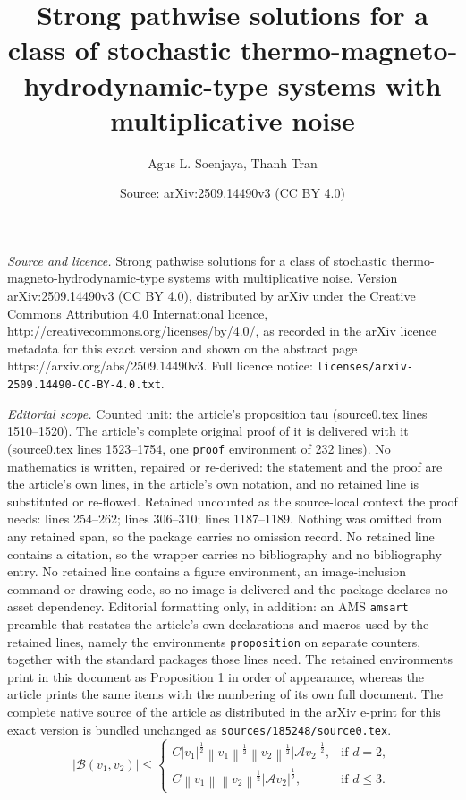 \documentclass[10pt,a4paper]{amsart}
\title{Strong pathwise solutions for a class of stochastic thermo-magneto-hydrodynamic-type systems with multiplicative noise}
\author{Agus L. Soenjaya, Thanh Tran}
\date{Source: arXiv:2509.14490v3 (CC BY 4.0)}
\newcommand{\abs}[1]{\left|{#1}\right|}
\newcommand{\norm}[1]{\left\|{#1}\right\|}
\begin{document}
\maketitle

\noindent\emph{Source and licence.} Strong pathwise solutions for a class of stochastic thermo-magneto-hydrodynamic-type systems with multiplicative noise. Version arXiv:2509.14490v3 (CC BY 4.0), distributed by arXiv under the Creative Commons Attribution 4.0 International licence, http://creativecommons.org/licenses/by/4.0/, as recorded in the arXiv licence metadata for this exact version and shown on the abstract page https://arxiv.org/abs/2509.14490v3. Full licence notice: \texttt{licenses/arxiv-2509.14490-CC-BY-4.0.txt}.\par\smallskip

\noindent\textit{Editorial scope.} Counted unit: the article's proposition tau (source0.tex lines 1510--1520). The article's complete original proof of it is delivered with it (source0.tex lines 1523--1754, one \texttt{proof} environment of 232 lines). No mathematics is written, repaired or re-derived: the statement and the proof are the article's own lines, in the article's own notation, and no retained line is substituted or re-flowed.  Retained uncounted as the source-local context the proof needs: lines 254--262; lines 306--310; lines 1187--1189.  Nothing was omitted from any retained span, so the package carries no omission record.  No retained line contains a citation, so the wrapper carries no bibliography and no bibliography entry.  No retained line contains a figure environment, an image-inclusion command or drawing code, so no image is delivered and the package declares no asset dependency.  Editorial formatting only, in addition: an AMS \texttt{amsart} preamble that restates the article's own declarations and macros used by the retained lines, namely the environments \texttt{proposition} on separate counters, together with the standard packages those lines need.  The retained environments print in this document as Proposition 1 in order of appearance, whereas the article prints the same items with the numbering of its own full document.  The complete native source of the article as distributed in the arXiv e-print for this exact version is bundled unchanged as \texttt{sources/185248/source0.tex}.
	\begin{equation}\label{equ:est B with A}
		\abs{\mathcal{B}(v_1,v_2)}
		\leq
		\begin{cases}
			C \abs{v_1}^{\frac12} \norm{v_1}^{\frac12} \norm{v_2}^{\frac12} \abs{\mathcal{A}v_2}^{\frac12}, &\text{if $d=2$},
			\\[1ex]
			C \norm{v_1} \norm{v_2}^{\frac12} \abs{\mathcal{A} v_2}^{\frac12}, &\text{if $d\le 3$}.
		\end{cases}
	\end{equation}
\end{document}
